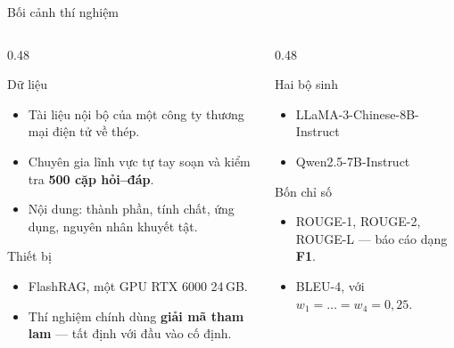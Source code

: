 \documentclass[aspectratio=169,10pt]{beamer}
\begin{document}
\begin{frame}{Bối cảnh thí nghiệm}
  \begin{columns}[T]
    \begin{column}{0.48\textwidth}
      \begin{block}{\small Dữ liệu}
        \begin{itemize}\footnotesize
          \item Tài liệu nội bộ của một công ty thương mại điện tử về thép.
          \item Chuyên gia lĩnh vực tự tay soạn và kiểm tra \textbf{500 cặp hỏi--đáp}.
          \item Nội dung: thành phần, tính chất, ứng dụng, nguyên nhân khuyết tật.
        \end{itemize}
      \end{block}
      \begin{block}{\small Thiết bị}
        \begin{itemize}\footnotesize
          \item FlashRAG, một GPU RTX 6000 24\,GB.
          \item Thí nghiệm chính dùng \textbf{giải mã tham lam} --- tất định với đầu vào cố định.
        \end{itemize}
      \end{block}
    \end{column}
    \begin{column}{0.48\textwidth}
      \begin{block}{\small Hai bộ sinh}
        \begin{itemize}\footnotesize
          \item LLaMA-3-Chinese-8B-Instruct
          \item Qwen2.5-7B-Instruct
        \end{itemize}
      \end{block}
      \begin{block}{\small Bốn chỉ số}
        \begin{itemize}\footnotesize
          \item ROUGE-1, ROUGE-2, ROUGE-L --- báo cáo dạng \textbf{F1}.
          \item BLEU-4, với $w_1=\dots=w_4=0{,}25$.
        \end{itemize}
      \end{block}
    \end{column}
  \end{columns}
\end{frame}
\end{document}
